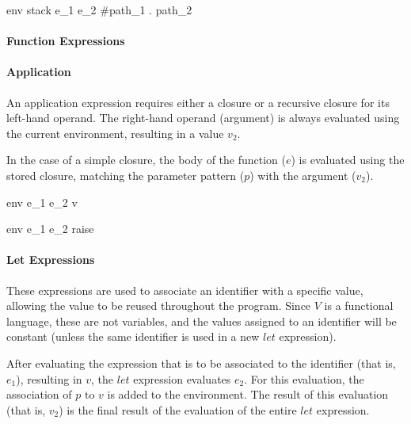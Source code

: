 \documentclass{article}
\begin{document}
    {\mbox{env} \vdash stack \; e_1 \; e_2 \Downarrow \#path_1 \; . \; path_2}



\paragraph{Function Expressions}


\paragraph{Application}
An application expression requires either a closure or a recursive closure for its left-hand operand.
The right-hand operand (argument) is always evaluated using the current environment, resulting in a value $v_2$.
\smallskip

In the case of a simple closure, the body of the function ($e$) is evaluated using the stored closure, matching the parameter pattern ($p$) with the argument ($v_2$).

    {\mbox{env} \vdash e_1 \; e_2 \Downarrow v}

    {\mbox{env} \vdash e_1 \; e_2 \Downarrow raise}

\paragraph{Let Expressions}
These expressions are used to associate an identifier with a specific value, allowing the value to be reused throughout the program.
Since $V$ is a functional language, these are not variables, and the values assigned to an identifier will be constant (unless the same identifier is used in a new $let$ expression).

After evaluating the expression that is to be associated to the identifier (that is, $e_1$), resulting in $v$, the $let$ expression evaluates $e_2$.
For this evaluation, the association of $p$ to $v$ is added to the environment.
The result of this evaluation (that is, $v_2$) is the final result of the evaluation of the entire $let$ expression.
\end{document}
